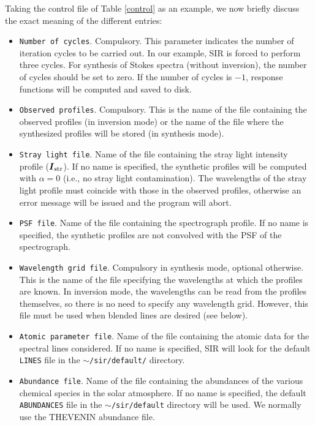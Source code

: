 \documentclass[11pt]{report}
\def\vec#1{\mbox{\boldmath $ #1$}}
\begin{document}
Taking the control file of Table \ref{control} as an example, we now
briefly discuss the exact meaning of the different entries:
\begin{itemize}
\item {\tt Number of cycles}. Compulsory. This parameter indicates the
number of iteration cycles to be carried out. In our example, SIR is
forced to perform three cycles. For synthesis of Stokes spectra
(without inversion), the number of cycles should be set to zero. 
If the number of cycles is $-1$, response functions will be computed and
saved to disk.
\item {\tt Observed profiles}. Compulsory. This is the name of the file
containing the observed profiles (in inversion mode) or the name of the
file where the synthesized profiles will be stored (in synthesis mode).
\item {\tt Stray light file}. Name of the file containing the stray
light intensity profile ($\vec{I}_{\rm str}$). If no name is specified,
the synthetic profiles will be computed with $\alpha=0$ (i.e., no stray
light contamination). The wavelengths of the stray light profile
must coincide with those in the observed profiles, otherwise
an error message will be issued and the program will abort.
\item {\tt PSF file}. Name of the file containing the spectrograph profile. If
no name is specified, the synthetic profiles are not convolved with the PSF of
the spectrograph.
\item {\tt Wavelength grid file}. Compulsory in synthesis mode, optional otherwise. 
This is the name of the file specifying the wavelengths at which the profiles are
known. In inversion mode, the wavelengths can be read from the profiles themselves,
so there is no need to specify any wavelength grid. However, this file must be
used when blended lines are desired (see below). 
\item {\tt Atomic parameter file}. Name of the file containing the atomic data
for the spectral lines considered. If no name is specified, SIR will look for
the default {\tt LINES} file in the {\tt $\sim$/sir/default/} directory.
\item {\tt Abundance file}. Name of the file containing the abundances of the
various chemical species in the solar atmosphere. If no name is specified, the
default {\tt ABUNDANCES} file in the {\tt $\sim $/sir/default} directory will be used. 
We normally use the THEVENIN abundance file.


\end{itemize}
\end{document}
